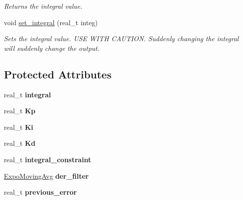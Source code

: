 \begin{DoxyCompactItemize}
\begin{DoxyCompactList}\small\item\em Returns the integral value. \end{DoxyCompactList}\item 
\hypertarget{classetk_1_1_p_i_d_controller_acb730031d516c2324ea5f735ae5b438d}{void \hyperlink{classetk_1_1_p_i_d_controller_acb730031d516c2324ea5f735ae5b438d}{set\-\_\-integral} (real\-\_\-t integ)}\label{classetk_1_1_p_i_d_controller_acb730031d516c2324ea5f735ae5b438d}

\begin{DoxyCompactList}\small\item\em Sets the integral value. U\-S\-E W\-I\-T\-H C\-A\-U\-T\-I\-O\-N. Suddenly changing the integral will suddenly change the output. \end{DoxyCompactList}\end{DoxyCompactItemize}
\subsection*{Protected Attributes}
\begin{DoxyCompactItemize}
\item 
\hypertarget{classetk_1_1_p_i_d_controller_a8e71515e4e16b112002214af79c11a1a}{real\-\_\-t {\bfseries integral}}\label{classetk_1_1_p_i_d_controller_a8e71515e4e16b112002214af79c11a1a}

\item 
\hypertarget{classetk_1_1_p_i_d_controller_a19b46ebbea3393181e911e8e58fdeddb}{real\-\_\-t {\bfseries Kp}}\label{classetk_1_1_p_i_d_controller_a19b46ebbea3393181e911e8e58fdeddb}

\item 
\hypertarget{classetk_1_1_p_i_d_controller_aa8250f45b88af74887e8e35074a558d5}{real\-\_\-t {\bfseries Ki}}\label{classetk_1_1_p_i_d_controller_aa8250f45b88af74887e8e35074a558d5}

\item 
\hypertarget{classetk_1_1_p_i_d_controller_a24c0abfcf440a7198c70fa7591299daf}{real\-\_\-t {\bfseries Kd}}\label{classetk_1_1_p_i_d_controller_a24c0abfcf440a7198c70fa7591299daf}

\item 
\hypertarget{classetk_1_1_p_i_d_controller_a5ad94c73ac49a5ab7dc0792d0856319c}{real\-\_\-t {\bfseries integral\-\_\-constraint}}\label{classetk_1_1_p_i_d_controller_a5ad94c73ac49a5ab7dc0792d0856319c}

\item 
\hypertarget{classetk_1_1_p_i_d_controller_a0c791c5663de648256850318f89b70c1}{\hyperlink{classetk_1_1_expo_moving_avg}{Expo\-Moving\-Avg} {\bfseries der\-\_\-filter}}\label{classetk_1_1_p_i_d_controller_a0c791c5663de648256850318f89b70c1}

\item 
\hypertarget{classetk_1_1_p_i_d_controller_a52d7c2dd196497f2543965e4473e017d}{real\-\_\-t {\bfseries previous\-\_\-error}}\label{classetk_1_1_p_i_d_controller_a52d7c2dd196497f2543965e4473e017d}

\end{DoxyCompactItemize}


